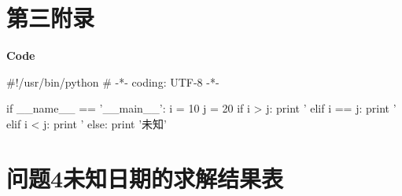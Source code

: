 \section{第三附录}
\textcolor[rgb]{0.98,0.00,0.00}{\textbf{Code}}
\begin{python}
#!/usr/bin/python
# -*- coding: UTF-8 -*-

if __name__ == '__main__':
i = 10
j = 20
if i > j:
print '%
elif i == j:
print '%
elif i < j:
print '%
else:
print '未知'	
\end{python}

\section{问题4未知日期的求解结果表}
